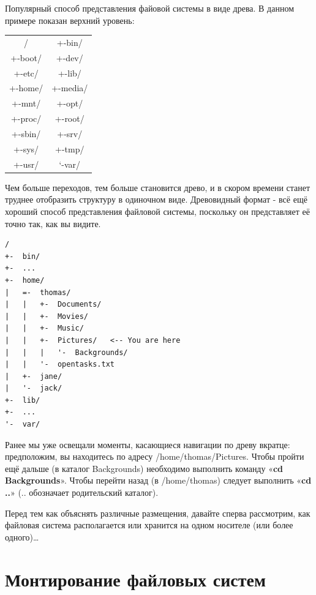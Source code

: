 \documentclass[10pt]{book}
\begin{document}
Популярный способ представления файовой системы в виде древа. В данном примере показан верхний уровень:

\vspace{3mm}
\begin{tcolorbox}
\begin{tabular}{cc}
	/ & +-bin/\\
	+-boot/ & +-dev/\\
	+-etc/ & +-lib/\\
	+-home/ & +-media/\\
	+-mnt/ & +-opt/\\
	+-proc/ & +-root/\\
	+-sbin/ & +-srv/\\
	+-sys/ & +-tmp/\\
	+-usr/ & `-var/\\
\end{tabular}
\end{tcolorbox}

Чем больше переходов, тем больше становится древо, и в скором времени станет труднее отобразить структуру в одиночном виде. Древовидный формат - всё ещё хороший способ представления файловой системы, поскольку он представляет её точно так, как вы видите.

\vspace{3mm}
\begin{tcolorbox}
\begin{lstlisting}
/
+-	bin/
+-	...
+-	home/
|	=-	thomas/
|	|	+-	Documents/
|	|	+-	Movies/
|	|	+-	Music/
|	|	+-	Pictures/	<-- You are here
|	|	|	'-	Backgrounds/
|	|	'-	opentasks.txt
|	+-	jane/
|	'-	jack/
+-	lib/
+-	...
'-	var/
\end{lstlisting}
\end{tcolorbox}

Ранее мы уже освещали моменты, касающиеся навигации по древу вкратце: предположим, вы находитесь по адресу /home/thomas/Pictures. Чтобы пройти ещё дальше (в каталог Backgrounds) необходимо выполнить команду «\textbf{cd Backgrounds}». Чтобы перейти назад (в /home/thomas) следует выполнить «\textbf{cd ..}» (.. обозначает родительский каталог).

Перед тем как объяснять различные размещения, давайте сперва рассмотрим, как файловая система располагается или хранится на одном носителе (или более одного)\ldots

\section{Монтирование файловых систем}
\end{document}
